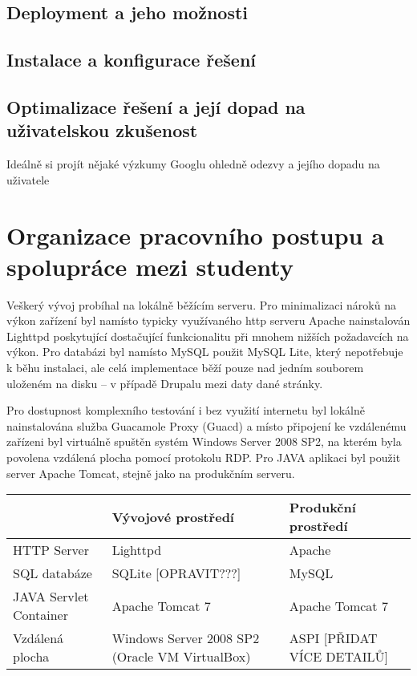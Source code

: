 \documentclass[11pt,draft,oneside]{fithesis2}
\begin{document}
\section{Deployment a jeho možnosti}
\section{Instalace a konfigurace řešení}
\section{Optimalizace řešení a její dopad na uživatelskou zkušenost}
Ideálně si projít nějaké výzkumy Googlu ohledně odezvy a jejího dopadu na uživatele

\chapter{Organizace pracovního postupu a spolupráce mezi studenty}

Veškerý vývoj probíhal na lokálně běžícím serveru. Pro minimalizaci nároků na výkon zařízení byl namísto typicky využívaného http serveru Apache nainstalován Lighttpd poskytující dostačující funkcionalitu při mnohem nižších požadavcích na výkon. Pro databázi byl namísto MySQL použit MySQL Lite, který nepotřebuje k běhu instalaci, ale celá implementace běží pouze nad jedním souborem uloženém na disku – v případě Drupalu mezi daty dané stránky. 

Pro dostupnost komplexního testování i bez využití internetu byl lokálně nainstalována služba Guacamole Proxy (Guacd) a místo připojení ke vzdálenému zařízeni byl virtuálně spuštěn systém Windows Server 2008 SP2, na kterém byla povolena vzdálená plocha pomocí protokolu RDP. Pro JAVA aplikaci byl použit server Apache Tomcat, stejně jako na produkčním serveru.

\begin{center}
  \begin{tabular}{ | p{3cm} | p{4cm} | p{4cm} | }
    \hline  
    & Vývojové prostředí & Produkční prostředí \\ \hline
    HTTP Server & Lighttpd & Apache \\ \hline
    SQL databáze & SQLite [OPRAVIT???] & MySQL \\ \hline
    JAVA Servlet Container & Apache Tomcat 7 & Apache Tomcat 7 \\ \hline
    Vzdálená plocha & Windows Server 2008 SP2 (Oracle VM VirtualBox) & ASPI [PŘIDAT VÍCE DETAILŮ] \\ \hline
  \end{tabular}
\end{center}
\end{document}
